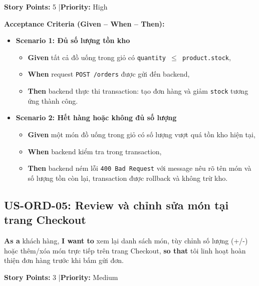 \documentclass[12pt,a4paper]{article}
\begin{document}
\textbf{Story Points:} 5 \quad|\quad \textbf{Priority:} High

\textbf{Acceptance Criteria (Given -- When -- Then):}
\begin{itemize}
  \item \textbf{Scenario 1: Đủ số lượng tồn kho}
  \begin{itemize}
    \item \textbf{Given} tất cả đồ uống trong giỏ có \texttt{quantity $\leq$ product.stock},
    \item \textbf{When} request \texttt{POST /orders} được gửi đến backend,
    \item \textbf{Then} backend thực thi transaction: tạo đơn hàng và giảm \texttt{stock} tương ứng thành công.
  \end{itemize}
  \item \textbf{Scenario 2: Hết hàng hoặc không đủ số lượng}
  \begin{itemize}
    \item \textbf{Given} một món đồ uống trong giỏ có số lượng vượt quá tồn kho hiện tại,
    \item \textbf{When} backend kiểm tra trong transaction,
    \item \textbf{Then} backend ném lỗi \texttt{400 Bad Request} với message nêu rõ tên món và số lượng tồn còn lại, transaction được rollback và không trừ kho.
  \end{itemize}
\end{itemize}

\subsection{US-ORD-05: Review và chỉnh sửa món tại trang Checkout}

\textbf{As a} khách hàng, \textbf{I want to} xem lại danh sách món, tùy chỉnh số lượng (+/-) hoặc thêm/xóa món trực tiếp trên trang Checkout, \textbf{so that} tôi linh hoạt hoàn thiện đơn hàng trước khi bấm gửi đơn.

\textbf{Story Points:} 3 \quad|\quad \textbf{Priority:} Medium
\end{document}
